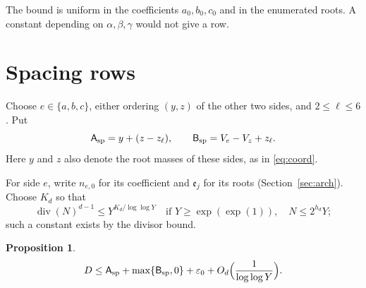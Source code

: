 \documentclass{amsart}
\newtheorem{proposition}[lemma]{Proposition}
\theoremstyle{definition}
\theoremstyle{plain}
\numberwithin{equation}{section}
\numberwithin{table}{section}
\newcommand{\pos}[1]{\max\{#1,0\}}
\begin{document}
The bound is uniform in the coefficients $a_0,b_0,c_0$ and in the enumerated
roots. A constant depending on $\alpha,\beta,\gamma$ would not give a row.

\section{Spacing rows}\label{sec:spacing}

Choose $e\in\{a,b,c\}$, either ordering $(y,z)$ of the other two sides, and
$2\le\ell\le6$. Put
\begin{equation}\label{eq:SPAB}
 \mathsf A_{\rm sp}=y+(z-z_\ell),\qquad
 \mathsf B_{\rm sp}=V_e-V_z+z_\ell .
\end{equation}
Here $y$ and $z$ also denote the root masses of these sides, as in
\eqref{eq:coord}.

For side $e$, write $n_{e,0}$ for its coefficient and $\mathfrak e_j$ for
its roots (Section~\ref{sec:arch}). Choose $K_d$ so that
\[
 \operatorname{div}(N)^{d-1}\le Y^{K_d/\log\log Y}
 \quad\text{if }Y\ge\exp(\exp(1)),\quad N\le2^{h_d}Y;
\]
such a constant exists by the divisor bound.

\begin{proposition}\label{prop:spacing}
\begin{equation}\label{eq:SP}
 D\le\mathsf A_{\rm sp}+\pos{\mathsf B_{\rm sp}}+\varepsilon_0
 +O_d\Bigl(\frac1{\log\log Y}\Bigr).
\end{equation}
\end{proposition}
\end{document}
